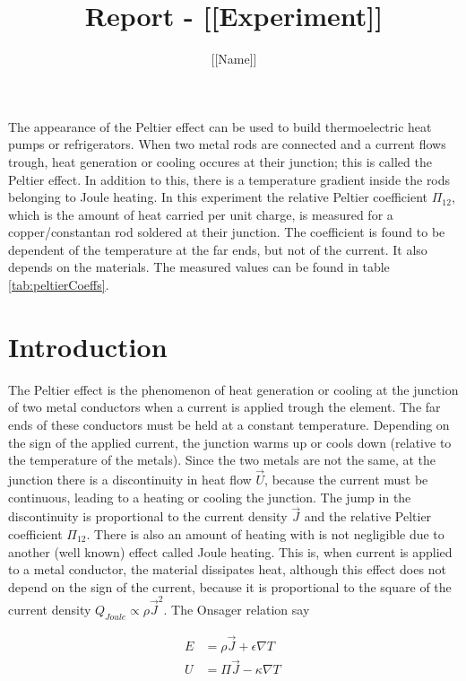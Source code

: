 \documentclass[a4paper]{article}
\author{[[Name]]}
\title{Report - [[Experiment]]}
\begin{document}
\maketitle
\abstract 

The appearance of the  Peltier effect can be used to build thermoelectric heat pumps or refrigerators. When two metal rods are connected and a current flows trough, heat generation or cooling occures at their junction; this is called the Peltier effect. In addition to this, there is a temperature gradient inside the rods belonging to Joule heating. In this experiment the relative Peltier coefficient $\Pi_{12}$, which is the amount of heat carried per unit charge, is measured for a copper/constantan rod soldered at their junction. The coefficient is found to be dependent of the temperature at the far ends, but not of the current. It also depends on the materials. The measured values can be found in table \ref{tab:peltierCoeffs}.

\section{Introduction}
\label{sec:introduction}

The Peltier effect is the phenomenon of heat generation or cooling at the junction of two metal conductors when a current is applied trough the element. The far ends of these conductors must be held at a constant temperature. Depending on the sign of the applied current, the junction warms up or cools down (relative to the temperature of the metals). Since the two metals are not the same, at the junction there is a discontinuity in heat flow $\vec{U}$, because the current must be continuous, leading to a heating or cooling the junction. The jump in the discontinuity is proportional to the current density $\vec{J}$ and the relative Peltier coefficient $\Pi_{12}$.
\newline
There is also an amount of heating with is not negligible due to another (well known) effect called Joule heating. This is, when current is applied to a metal conductor, the material dissipates heat, although this effect does not depend on the sign of the current, because it is proportional to the square of the current density $Q_{Joule} \propto \rho \vec{J}^2$.
\newline
The Onsager relation say

\begin{subequations}
\begin{align}
    E &= \rho \vec{J} + \epsilon \nabla T \	\label{eq:E} \\
    U &= \Pi \vec{J} - \kappa \nabla T \ \label{eq:U}
\end{align}
\end{subequations}
\end{document}
